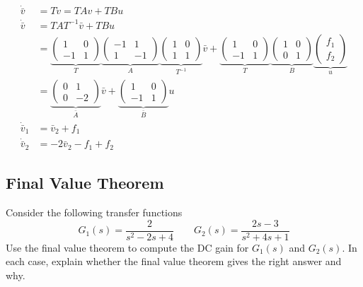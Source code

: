 \documentclass[12pt]{article}
\begin{document}
$$
\begin{aligned}
\dot{\bar{v}} & =T \dot{v}=T A v+T B u \\
\dot{\bar{v}} & =T A T^{-1} \bar{v}+T B u \\
& =\underbrace{\left(\begin{array}{cc}
1 & 0 \\
-1 & 1
\end{array}\right)}_T \underbrace{\left(\begin{array}{cc}
-1 & 1 \\
1 & -1
\end{array}\right)}_A \underbrace{\left(\begin{array}{ll}
1 & 0 \\
1 & 1
\end{array}\right)}_{T^{-1}} \bar{v}+\underbrace{\left(\begin{array}{cc}
1 & 0 \\
-1 & 1
\end{array}\right)}_T \underbrace{\left(\begin{array}{cc}
1 & 0 \\
0 & 1
\end{array}\right)}_B \underbrace{\left(\begin{array}{l}
f_1 \\
f_2
\end{array}\right)}_u \\
& =\underbrace{\left(\begin{array}{cc}
0 & 1 \\
0 & -2
\end{array}\right)}_{\bar{A}} \bar{v}+\underbrace{\left(\begin{array}{cc}
1 & 0 \\
-1 & 1
\end{array}\right)}_{\bar{B}} u \\
\dot{\bar{v}}_1 & =\bar{v}_2+f_1 \\
\dot{\bar{v}}_2 & =-2 \bar{v}_2-f_1+f_2
\end{aligned}
$$

\clearpage
\subsection{Final Value Theorem}

Consider the following transfer functions
\[
G_1(s)=\frac{2}{s^2 - 2s + 4} \qquad G_2(s)=\frac{2s -3}{s^2 + 4s + 1}
\]
Use the final value theorem to compute the DC gain for $G_1(s)$ and $G_2(s)$. In each case, explain whether the final value theorem gives the right answer and why. \\
\end{document}
